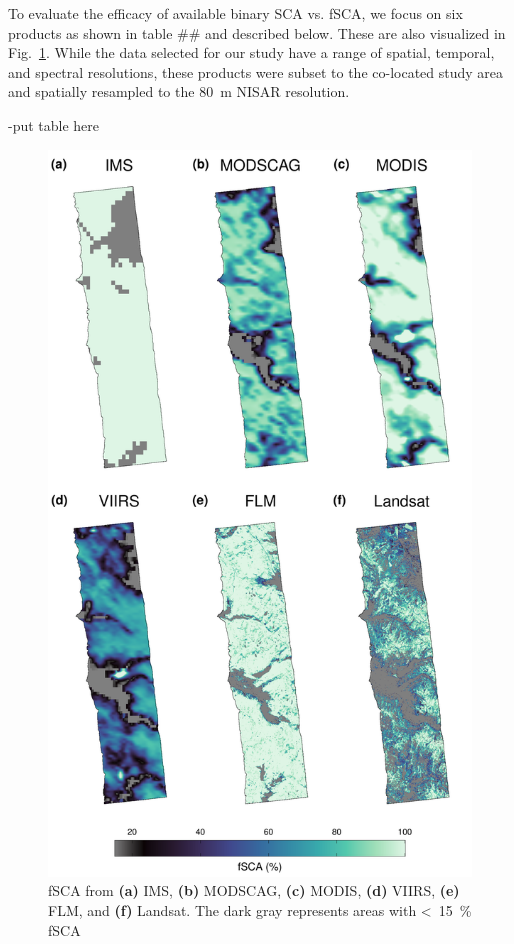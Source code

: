 To evaluate the efficacy of available binary SCA vs. fSCA, we focus on six products as shown in table ## and described below. These are also visualized in Fig.~\ref{fig:fsca_plot}. While the data selected for our study have a range of spatial, temporal, and spectral resolutions, these products were subset to the co-located study area and spatially resampled to the 80~m NISAR resolution.  


-put table here

\begin{figure}[h]
\includegraphics[width=13cm]{figures/ch4_figs/fsca_usvar_v2.pdf}
\caption{fSCA from \textbf{(a)} IMS, \textbf{(b)} MODSCAG, \textbf{(c)} MODIS, \textbf{(d)} VIIRS, \textbf{(e)} FLM, and \textbf{(f)} Landsat. The dark gray represents areas with <~15~\% fSCA}
\label{fig:fsca_plot}
\end{figure}

